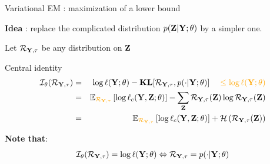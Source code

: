 \documentclass[compress,10pt]{beamer}
\begin{document}
 
 \begin{frame}{Variational EM  : maximization of a lower bound}


\textcolor{dgreen}{\textbf{Idea}} : replace the complicated distribution $p(\mathbf{Z} | \mathbf{Y}; \theta)$ by a simpler one. 


Let $\mathcal{R}_{\mathbf{Y},\mathbf{\tau}}$ be any distribution on   $\mathbf{Z}$


\begin{block}{Central identity}
\begin{eqnarray*}
\mathcal{I}_{\theta}(\mathcal{R}_{\Xall,\btau}) &=& \log \ell(\Xall ; \theta) -   \mathbf{KL}[\mathcal{R}_{\Xall,\btau}, p(\cdot | \Xall; \theta)] \color{dgreen}\quad \leq   \log \ell(\Xall ; \theta)   \\
&=& \mathbb{E}_{\color{dgreen}\mathcal{R}_{\Xall,\btau}} \left[\log \ell_c(\bX,\bZ; \theta)   \right]  -   \sum_{\Zall} \mathcal{R}_{\Xall,\btau}(\bZ)  \log \mathcal{R}_{\Xall,\btau}({\bZ}) \\
&=& \mathbb{E}_{\color{dgreen}\mathcal{R}_{\Xall,\btau}} \left[\log \ell_c(\bX,\bZ; \theta)   \right]  +  \mathcal{H}\left(\mathcal{R}_{\Xall,\btau}(\bZ)\right) 
\end{eqnarray*}
\end{block} 

\textbf{Note that}:  
$$\mathcal{I}_{\theta}(\mathcal{R}_{\mathbf{Y},\mathbf{\tau}})  = \log \ell(\mathbf{Y}; \theta) \Leftrightarrow \mathcal{R}_{\mathbf{Y},\mathbf{\tau}} = p(\cdot | \mathbf{Y}; \theta)$$ 


\end{frame}
\end{document}
